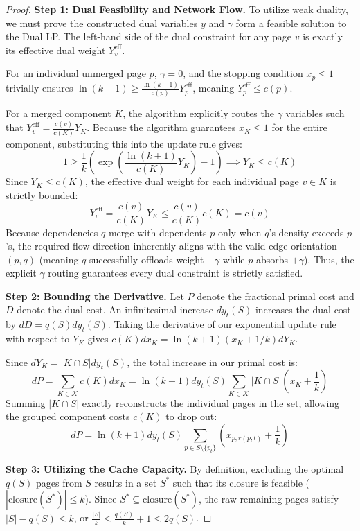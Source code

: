 \documentclass[a4paper]{article}
\begin{document}
\begin{proof}
\textbf{Step 1: Dual Feasibility and Network Flow.} To utilize weak duality, we must prove the constructed dual variables $y$ and $\gamma$ form a feasible solution to the Dual LP. The left-hand side of the dual constraint for any page $v$ is exactly its effective dual weight $Y_v^{\text{eff}}$. 

For an individual unmerged page $p$, $\gamma = 0$, and the stopping condition $x_p \le 1$ trivially ensures $\ln(k+1) \ge \frac{\ln(k+1)}{c(p)} Y_p^{\text{eff}}$, meaning $Y_p^{\text{eff}} \le c(p)$. 

For a merged component $K$, the algorithm explicitly routes the $\gamma$ variables such that $Y_v^{\text{eff}} = \frac{c(v)}{c(K)} Y_K$. Because the algorithm guarantees $x_K \le 1$ for the entire component, substituting this into the update rule gives:
$$ 1 \ge \frac{1}{k} \left( \exp\left( \frac{\ln(k+1)}{c(K)} Y_K \right) - 1 \right) \implies Y_K \le c(K) $$
Since $Y_K \le c(K)$, the effective dual weight for each individual page $v \in K$ is strictly bounded:
$$ Y_v^{\text{eff}} = \frac{c(v)}{c(K)} Y_K \le \frac{c(v)}{c(K)} c(K) = c(v) $$
Because dependencies $q$ merge with dependents $p$ only when $q$'s density exceeds $p$'s, the required flow direction inherently aligns with the valid edge orientation $(p,q)$ (meaning $q$ successfully offloads weight $-\gamma$ while $p$ absorbs $+\gamma$). Thus, the explicit $\gamma$ routing guarantees every dual constraint is strictly satisfied.

\textbf{Step 2: Bounding the Derivative.} Let $P$ denote the fractional primal cost and $D$ denote the dual cost. An infinitesimal increase $dy_t(S)$ increases the dual cost by $dD = q(S) dy_t(S)$. Taking the derivative of our exponential update rule with respect to $Y_K$ gives $c(K) dx_K = \ln(k+1) (x_K + 1/k) dY_K$. 

Since $dY_K = |K \cap S| dy_t(S)$, the total increase in our primal cost is:
$$ dP = \sum_{K \in \mathcal{K}} c(K) dx_K = \ln(k+1) dy_t(S) \sum_{K \in \mathcal{K}} |K \cap S| \left( x_K + \frac{1}{k} \right) $$
Summing $|K \cap S|$ exactly reconstructs the individual pages in the set, allowing the grouped component costs $c(K)$ to drop out:
$$ dP = \ln(k+1) dy_t(S) \sum_{p \in S \setminus \{p_t\}} \left( x_{p,r(p,t)} + \frac{1}{k} \right) $$

\textbf{Step 3: Utilizing the Cache Capacity.} By definition, excluding the optimal $q(S)$ pages from $S$ results in a set $S^*$ such that its closure is feasible ($|\text{closure}(S^*)| \le k$). Since $S^* \subseteq \text{closure}(S^*)$, the raw remaining pages satisfy $|S| - q(S) \le k$, or $\frac{|S|}{k} \le \frac{q(S)}{k} + 1 \le 2q(S)$.


\end{proof}
\end{document}
